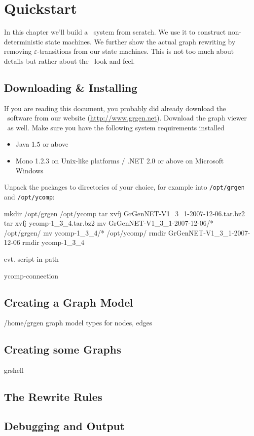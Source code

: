 \chapter{Quickstart}


In this chapter we'll build a \GrG\ system from scratch. 
We use it to construct non-deterministic state machines.
We further show the actual graph rewriting by removing $\varepsilon$-transitions from our state machines.
This is not too much about details but rather about the \GrG\ look and feel.

\section{Downloading \& Installing}
If you are reading this document, you probably did already download the \GrG\ software from our website (\url{http://www.grgen.net}).
Download the graph viewer \yComp\ as well.
Make sure you have the following system requirements installed
\begin{itemize}
	\item Java 1.5 or above
	\item Mono 1.2.3 on Unix-like platforms / .NET 2.0 or above on Microsoft Windows 
\end{itemize}
Unpack the packages to directories of your choice, for example into \texttt{/opt/grgen} and \texttt{/opt/ycomp}:
\begin{bash}
mkdir /opt/grgen /opt/ycomp
tar xvfj GrGenNET-V1_3_1-2007-12-06.tar.bz2
tar xvfj ycomp-1_3_4.tar.bz2
mv GrGenNET-V1_3_1-2007-12-06/* /opt/grgen/
mv ycomp-1_3_4/* /opt/ycomp/
rmdir GrGenNET-V1_3_1-2007-12-06 
rmdir ycomp-1_3_4
\end{bash}

evt. script in path

ycomp-connection

\section{Creating a Graph Model}
/home/grgen
graph model types for nodes, edges

\section{Creating some Graphs}
grshell

\section{The Rewrite Rules}

\section{Debugging and Output}
